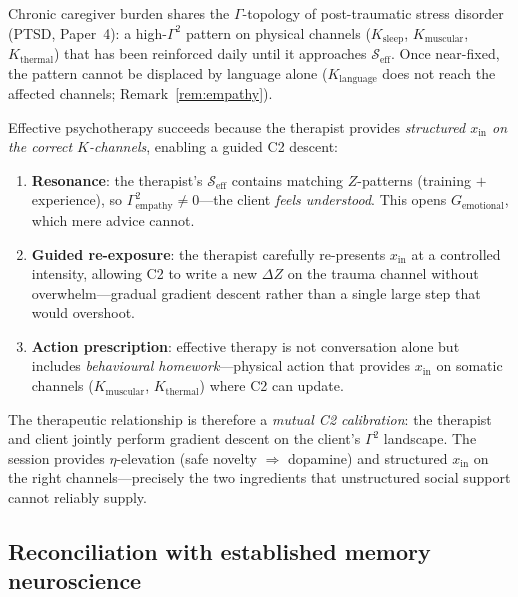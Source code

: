 \documentclass[aps,pre,twocolumn,superscriptaddress,floatfix]{revtex4-2}
\begin{document}
\begin{remark}
\label{rem:therapy}
Chronic caregiver burden shares the $\Gamma$-topology of
post-traumatic stress disorder (PTSD, Paper~4):
a high-$\Gamma^2$ pattern on physical channels
($K_{\text{sleep}}$, $K_{\text{muscular}}$,
$K_{\text{thermal}}$) that has been reinforced daily
until it approaches $\mathcal{S}_{\text{eff}}$.
Once near-fixed, the pattern cannot be displaced by
language alone ($K_{\text{language}}$ does
not reach the affected channels;
Remark~\ref{rem:empathy}).

Effective psychotherapy succeeds because the therapist
provides \emph{structured $x_{\text{in}}$ on the
correct $K$-channels}, enabling a guided C2 descent:
\begin{enumerate}
  \item \textbf{Resonance}:
    the therapist's $\mathcal{S}_{\text{eff}}$ contains
    matching $Z$-patterns (training $+$ experience),
    so $\Gamma^2_{\text{empathy}} \neq 0$---the client
    \emph{feels understood}.
    This opens $G_{\text{emotional}}$, which mere
    advice cannot.
  \item \textbf{Guided re-exposure}:
    the therapist carefully re-presents
    $x_{\text{in}}$ at a controlled intensity,
    allowing C2 to write a new $\Delta Z$ on the
    trauma channel without overwhelm---gradual gradient
    descent rather than a single large step that
    would overshoot.
  \item \textbf{Action prescription}:
    effective therapy is not conversation alone
    but includes \emph{behavioural homework}---physical
    action that provides $x_{\text{in}}$ on somatic
    channels ($K_{\text{muscular}}$,
    $K_{\text{thermal}}$) where C2 can update.
\end{enumerate}
The therapeutic relationship is therefore a
\emph{mutual C2 calibration}: the therapist and client
jointly perform gradient descent on the client's
$\Gamma^2$ landscape.
The session provides $\eta$-elevation (safe novelty
$\Rightarrow$ dopamine) and structured $x_{\text{in}}$
on the right channels---precisely the two ingredients
that unstructured social support cannot reliably supply.
\end{remark}

\subsection{Reconciliation with established memory neuroscience}
\label{sec:memory-reconciliation}
\end{document}
